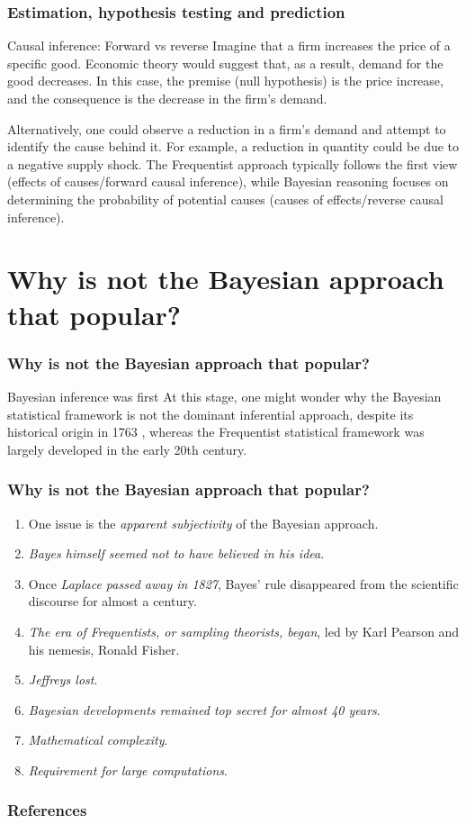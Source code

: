 \documentclass[12pt, compress]{beamer}
\begin{document}
\begin{frame}
	\frametitle{Estimation, hypothesis testing and prediction}
	\begin{block}{Causal inference: Forward vs reverse}
		Imagine that a firm increases the price of a specific good. Economic theory would suggest that, as a result, demand for the good decreases. In this case, the premise (null hypothesis) is the price increase, and the consequence is the decrease in the firm's demand.
		
		Alternatively, one could observe a reduction in a firm's demand and attempt to identify the cause behind it. For example, a reduction in quantity could be due to a negative supply shock. The Frequentist approach typically follows the first view (effects of causes/forward causal inference), while Bayesian reasoning focuses on determining the probability of potential causes (causes of effects/reverse causal inference).
	\end{block}
\end{frame}

\section{Why is not the Bayesian approach that popular?}

\begin{frame}
	\frametitle{Why is not the Bayesian approach that popular?}
	\begin{block}{Bayesian inference was first}
		At this stage, one might wonder why the Bayesian statistical framework is not the dominant inferential approach, despite its historical origin in 1763 \citep{bayes1763lii}, whereas the Frequentist statistical framework was largely developed in the early 20th century.
	\end{block}
\end{frame}

\begin{frame}
	\frametitle{Why is not the Bayesian approach that popular?}

	\begin{enumerate}
		\item One issue is the \textit{apparent subjectivity} of the Bayesian approach.
		\item \textit{Bayes himself seemed not to have believed in his idea}.
		\item Once \textit{Laplace passed away in 1827}, Bayes' rule disappeared from the scientific discourse for almost a century.
		\item \textit{The era of Frequentists, or sampling theorists, began}, led by Karl Pearson and his nemesis, Ronald Fisher.
		\item \textit{Jeffreys lost}.
		\item \textit{Bayesian developments remained top secret for almost 40 years}.
		\item  \textit{Mathematical complexity}.
		\item \textit{Requirement for large computations}.
	\end{enumerate}
\end{frame}

\begin{frame}[allowframebreaks]
	\frametitle{References}
		{\footnotesize
		
		}
\end{frame}
			
\end{document}
